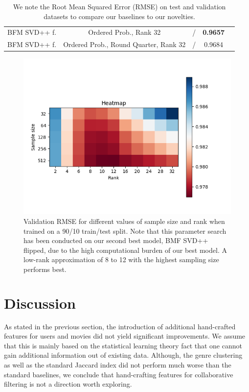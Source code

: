 \documentclass[10pt,conference,compsocconf]{IEEEtran}
\begin{document}
\begin{table}
{\begin{tabular}{|| c | c | c | c | c ||}
            BFM SVD++ f.         & Ordered Prob., Rank 32                & /                       & \textbf{ 0.9657 }      &                         \\
            BFM SVD++ f.         & Ordered Prob., Round Quarter, Rank 32 & /                       & 0.9684                 &                         \\
            \hline
        \end{tabular}
        }
        \caption{We note the Root Mean Squared Error (RMSE) on test and validation datasets to compare our baselines to our novelties.}
        \label{tab:ablation}
    \end{table}


    \begin{figure}
        \includegraphics[width=\columnwidth]{figures/heatmap.png}
        \caption{Validation RMSE for different values of sample size and rank when trained on a 90/10 train/test split. Note that this parameter search has been conducted on our second best model, BMF SVD++ flipped, due to the high computational burden of our best model.
        A low-rank approximation of 8 to 12 with the highest sampling size performs best.}
        \label{fig:Heatmap}
    \end{figure}


    \section{Discussion}
    As stated in the previous section, the introduction of additional hand-crafted features for users and movies did not yield significant improvements.
    We assume that this is mainly based on the statistical learning theory fact that one cannot gain additional information out of existing data.
    Although, the genre clustering as well as the standard Jaccard index did not perform much worse than the standard baselines, we conclude that hand-crafting features for collaborative filtering is not a direction worth exploring.
\end{document}
